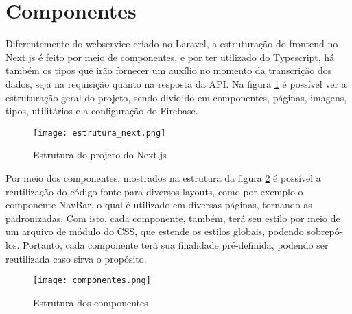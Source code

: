 \section{Componentes}
Diferentemente do webservice criado no Laravel, a estruturação do frontend no Next.js é feito por meio de componentes, e por ter utilizado do Typescript, há também os tipos que irão fornecer um auxílio no momento da transcrição dos dados, seja na requisição quanto na resposta da API. Na figura \ref{estrutura_next} é possível ver a estruturação geral do projeto, sendo dividido em componentes, páginas, imagens, tipos, utilitários e a configuração do Firebase.
\begin{figure}[h]
    \caption{\label{estrutura_next}Estrutura do projeto do Next.js}
    \vspace{5pt}
    \centering
    \texttt{[image: estrutura\_next.png]}
    \vspace{5pt}
\end{figure}

Por meio dos componentes, mostrados na estrutura da figura \ref{componentes} é possível a reutilização do código-fonte para diversos layouts, como por exemplo o componente NavBar, o qual é utilizado em diversas páginas, tornando-as padronizadas. Com isto, cada componente, também, terá seu estilo por meio de um arquivo de módulo do CSS, que estende os estilos globais, podendo sobrepô-los. Portanto, cada componente terá sua finalidade pré-definida, podendo ser reutilizada caso sirva o propósito.
\begin{figure}[h]
    \caption{\label{componentes}Estrutura dos componentes}
    \vspace{5pt}
    \centering
    \texttt{[image: componentes.png]}
    \vspace{5pt}
\end{figure}


